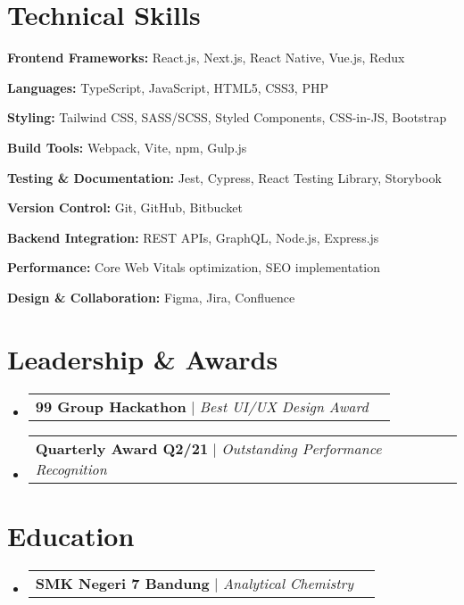 \documentclass[a4paper, 11pt]{article}
\makeatletter
\newcommand{\resumeProjectHeading}[2]{
    \item
    \begin{tabular*}{0.987\textwidth}{l@{\extracolsep{\fill}}r}
      \small#1\\
    \end{tabular*}\vspace{-7pt}
}
\newcommand{\resumeSubHeadingListStart}{\begin{itemize}[leftmargin=0.1in, label={}]}
\newcommand{\resumeSubHeadingListEnd}{\end{itemize}\vspace{5pt}}
\makeatother
\begin{document}
\section{Technical Skills}
    \resumeSubHeadingListStart
        \small{
            \item \textbf{Frontend Frameworks:} React.js, Next.js, React Native, Vue.js, Redux
            \item \textbf{Languages:} TypeScript, JavaScript, HTML5, CSS3, PHP
            \item \textbf{Styling:} Tailwind CSS, SASS/SCSS, Styled Components, CSS-in-JS, Bootstrap
            \item \textbf{Build Tools:} Webpack, Vite, npm, Gulp.js
            \item \textbf{Testing \& Documentation:} Jest, Cypress, React Testing Library, Storybook
            \item \textbf{Version Control:} Git, GitHub, Bitbucket
            \item \textbf{Backend Integration:} REST APIs, GraphQL, Node.js, Express.js
            \item \textbf{Performance:} Core Web Vitals optimization, SEO implementation
            \item \textbf{Design \& Collaboration:} Figma, Jira, Confluence
        }
    \resumeSubHeadingListEnd

\section{Leadership \& Awards}
    \resumeSubHeadingListStart
        \resumeProjectHeading
            {\textbf{99 Group Hackathon} $|$ \emph{Best UI/UX Design Award}}{2021}
        \resumeProjectHeading
            {\textbf{Quarterly Award Q2/21} $|$ \emph{Outstanding Performance Recognition}}{2021}
    \resumeSubHeadingListEnd

\section{Education}
    \resumeSubHeadingListStart
        \resumeProjectHeading
            {\textbf{SMK Negeri 7 Bandung} $|$ \emph{Analytical Chemistry}}{2009 -- 2011}
    \resumeSubHeadingListEnd
\end{document}
